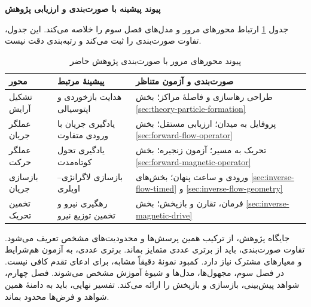 \textbf{پیوند پیشینه با صورت‌بندی و ارزیابی پژوهش}

جدول \ref{tab:lit-synthesis-thesis-links} ارتباط محورهای مرور و مدل‌های فصل سوم را خلاصه می‌کند.
این جدول، تفاوت صورت‌بندی را ثبت می‌کند و رتبه‌بندی دقت نیست.

\begin{table}[htbp]
\centering
\small
\setlength{\tabcolsep}{4pt}
\caption{پیوند محورهای مرور با صورت‌بندی پژوهش حاضر}
\label{tab:lit-synthesis-thesis-links}
\begin{tabular}{p{}p{}p{}}
\hline
محور & پیشینهٔ مرتبط & صورت‌بندی و آزمون متناظر \\
\hline
تشکیل آرایش
& هدایت بازخوردی و اپتوسیالی \cite{Shenoy2016StokesTrap,Erben2024Optofluidic}
& طراحی رهاسازی و فاصلهٔ مراکز؛ بخش \mbox{\ref{sec:theory-particle-formation}} \\
عملگر جریان
& یادگیری جریان با ورودی متفاوت \cite{Onishi2026FlowConditions}
& پروفایل به میدان؛ ارزیابی مستقل؛ بخش \mbox{\ref{sec:forward-flow-operator}} \\
عملگر حرکت
& یادگیری تحول کوتاه‌مدت \cite{Wang2023LongTime}
& تحریک به مسیر؛ آزمون زنجیره؛ بخش \mbox{\ref{sec:forward-magnetic-operator}} \\
بازسازی جریان
& بازسازی لاگرانژی–اویلری \cite{Wan2026TrajectoryFlowNet,ZhouGrauer2026Joint}
& ورودی و ساعت پنهان؛ بخش‌های \mbox{\ref{sec:inverse-flow-timed}} و \mbox{\ref{sec:inverse-flow-geometry}} \\
تخمین تحریک
& رهگیری نیرو و تخمین توزیع نیرو \cite{ElHamdaoui2026Tracking,Strayer2024ForceMapping}
& فرمان، تقارن و بازپخش؛ بخش \mbox{\ref{sec:inverse-magnetic-drive}} \\
\hline
\end{tabular}
\end{table}

جایگاه پژوهش، از ترکیب همین پرسش‌ها و محدودیت‌های مشخص تعریف می‌شود.
تفاوت صورت‌بندی، باید از برتری عددی متمایز بماند.
برتری عددی، به آزمون هم‌شرایط و معیارهای مشترک نیاز دارد.
کمبود نمونهٔ دقیقاً مشابه، برای ادعای تقدم کافی نیست.
در فصل سوم، مجهول‌ها، مدل‌ها و شیوهٔ آموزش مشخص می‌شوند.
فصل چهارم، شواهد پیش‌بینی، بازسازی و بازپخش را ارائه می‌کند.
تفسیر نهایی، باید به دامنهٔ همین شواهد و فرض‌ها محدود بماند.
